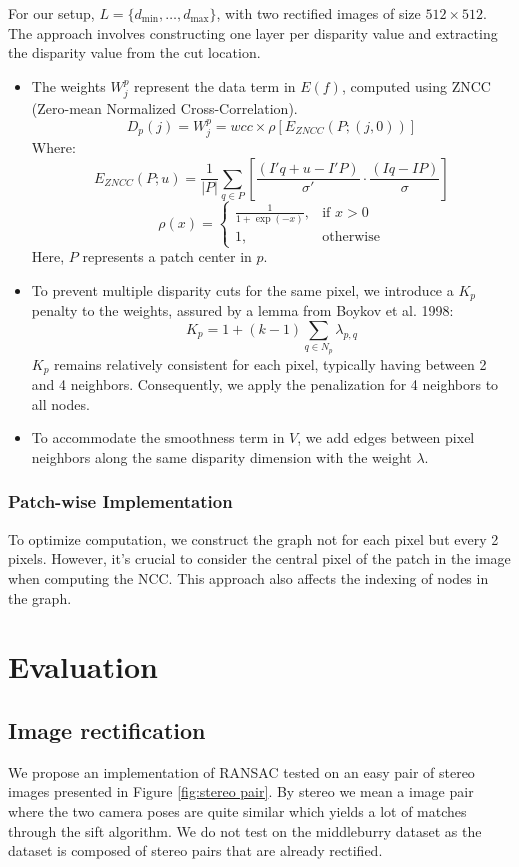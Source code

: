 \documentclass[10pt,twocolumn,letterpaper]{article}
\begin{document}
For our setup, \(L=\{ d_{\text{min}}, \dots, d_{\text{max}}\}\), with two rectified images of size \(512 \times 512\). The approach involves constructing one layer per disparity value and extracting the disparity value from the cut location.

\begin{itemize}
    \item The weights \(W_j^p\) represent the data term in \(E(f)\), computed using ZNCC (Zero-mean Normalized Cross-Correlation).
    \[
    D_p(j)=W_j^p=wcc \times \rho[E_{ZNCC}(P ; (j ,0))]
    \]
    Where:
    \[
    E_{ZNCC}(P;u) = \frac{1}{|P|} \sum_{q \in P} \left[\frac{(I'q + u - I'P)}{\sigma'} \cdot \frac{(Iq - IP)}{\sigma}\right]
    \]
    \[
    \rho(x) = \begin{cases}
        \frac{1}{1 + \exp(-x)}, & \text{if } x > 0 \\
        1, & \text{otherwise}
    \end{cases}
    \]
    Here, \(P\) represents a patch center in \(p\).
    
    \item To prevent multiple disparity cuts for the same pixel, we introduce a \(K_p\) penalty to the weights, assured by a lemma from Boykov et al. 1998:
    \[
    K_p = 1 + (k-1) \sum_{q \in N_p} \lambda_{p,q}
    \]
    \(K_p\) remains relatively consistent for each pixel, typically having between 2 and 4 neighbors. Consequently, we apply the penalization for 4 neighbors to all nodes.
    
    \item To accommodate the smoothness term in \(V\), we add edges between pixel neighbors along the same disparity dimension with the weight \(\lambda\).
\end{itemize}

\subsubsection{Patch-wise Implementation}

To optimize computation, we construct the graph not for each pixel but every 2 pixels. However, it's crucial to consider the central pixel of the patch in the image when computing the NCC. This approach also affects the indexing of nodes in the graph.


\section{Evaluation}
\subsection{Image rectification}
We propose an implementation of RANSAC tested on an easy pair of stereo images presented in Figure \ref{fig:stereo pair}. By stereo we mean a image pair where the two camera poses are quite similar which yields a lot of matches through the sift algorithm. We do not test on the middleburry dataset as the dataset is composed of stereo pairs that are already rectified. 
\end{document}
